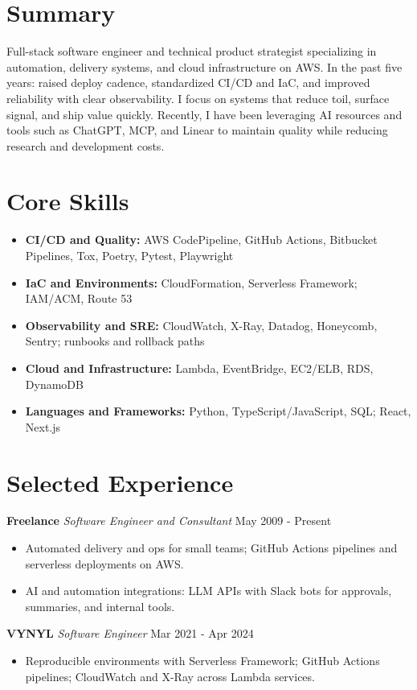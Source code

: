 \documentclass[10pt]{article}
\begin{document}
\section*{Summary}
Full-stack software engineer and technical product strategist specializing in automation, delivery systems, and cloud infrastructure on AWS. In the past five years: raised deploy cadence, standardized CI/CD and IaC, and improved reliability with clear observability. I focus on systems that reduce toil, surface signal, and ship value quickly. Recently, I have been leveraging AI resources and tools such as ChatGPT, MCP, and Linear to maintain quality while reducing research and development costs.

\section*{Core Skills}
\begin{itemize}[leftmargin=*]
  \item \textbf{CI/CD and Quality:} AWS CodePipeline, GitHub Actions, Bitbucket Pipelines, Tox, Poetry, Pytest, Playwright
  \item \textbf{IaC and Environments:} CloudFormation, Serverless Framework; IAM/ACM, Route 53
  \item \textbf{Observability and SRE:} CloudWatch, X-Ray, Datadog, Honeycomb, Sentry; runbooks and rollback paths
  \item \textbf{Cloud and Infrastructure:} Lambda, EventBridge, EC2/ELB, RDS, DynamoDB
  \item \textbf{Languages and Frameworks:} Python, TypeScript/JavaScript, SQL; React, Next.js
\end{itemize}

\section*{Selected Experience}
\noindent\textbf{Freelance} \textit{Software Engineer and Consultant} \hfill May 2009 - Present\par
\begin{itemize}
  \item Automated delivery and ops for small teams; GitHub Actions pipelines and serverless deployments on AWS.
  \item AI and automation integrations: LLM APIs with Slack bots for approvals, summaries, and internal tools.
\end{itemize}

\noindent\textbf{VYNYL} \textit{Software Engineer} \hfill Mar 2021 - Apr 2024\par
\begin{itemize}
  \item Reproducible environments with Serverless Framework; GitHub Actions pipelines; CloudWatch and X-Ray across Lambda services.
\end{itemize}
\end{document}
